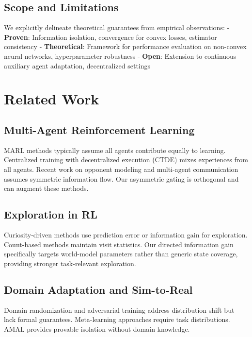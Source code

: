 \documentclass[12pt, a4paper]{article}
\begin{document}
\subsection{Scope and Limitations}

We explicitly delineate theoretical guarantees from empirical observations:
- \textbf{Proven}: Information isolation, convergence for convex losses, estimator consistency
- \textbf{Theoretical}: Framework for performance evaluation on non-convex neural networks, hyperparameter robustness
- \textbf{Open}: Extension to continuous auxiliary agent adaptation, decentralized settings

\section{Related Work}

\subsection{Multi-Agent Reinforcement Learning}
MARL methods typically assume all agents contribute equally to learning. Centralized training with decentralized execution (CTDE) \cite{oliehoek2016concise} mixes experiences from all agents. Recent work on opponent modeling \cite{he2016opponent} and multi-agent communication \cite{foerster2016learning} assumes symmetric information flow. Our asymmetric gating is orthogonal and can augment these methods.

\subsection{Exploration in RL}
Curiosity-driven methods \cite{pathak2017curiosity,burda2019exploration} use prediction error or information gain for exploration. Count-based methods \cite{bellemare2016unifying} maintain visit statistics. Our directed information gain specifically targets world-model parameters rather than generic state coverage, providing stronger task-relevant exploration.

\subsection{Domain Adaptation and Sim-to-Real}
Domain randomization \cite{tobin2017domain} and adversarial training \cite{pinto2017robust} address distribution shift but lack formal guarantees. Meta-learning approaches \cite{finn2017model} require task distributions. AMAL provides provable isolation without domain knowledge.
\end{document}

